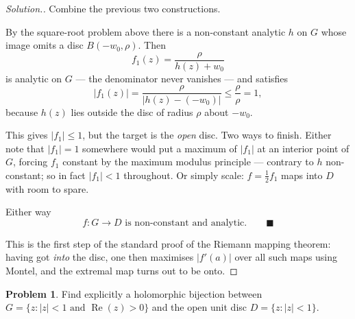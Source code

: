 \documentclass[11pt,a4paper]{article}
\theoremstyle{definition}
\newtheorem{problemx}{Problem}[section]
\newenvironment{problem}{\begin{problemx}}{\end{problemx}}
\newenvironment{solution}
  {\renewcommand{\qedsymbol}{}\begin{proof}[\textit{Solution}.]}
  {\end{proof}}
\begin{document}
\begin{solution}
Combine the previous two constructions.

By the square-root problem above there is a non-constant analytic $h$ on $G$ whose
image omits a disc $B(-w_0,\rho)$. Then
$$f_1(z) = \frac{\rho}{h(z)+w_0}$$
is analytic on $G$ --- the denominator never vanishes --- and satisfies
$$\left|f_1(z)\right| = \frac{\rho}{\left|h(z)-(-w_0)\right|} \leq \frac{\rho}{\rho} = 1,$$
because $h(z)$ lies outside the disc of radius $\rho$ about $-w_0$.

This gives $\left|f_1\right| \leq 1$, but the target is the \emph{open} disc. Two
ways to finish. Either note that $\left|f_1\right| = 1$ somewhere would put a
maximum of $\left|f_1\right|$ at an interior point of $G$, forcing $f_1$ constant
by the maximum modulus principle --- contrary to $h$ non-constant; so in fact
$\left|f_1\right| < 1$ throughout. Or simply scale: $f = \tfrac12 f_1$ maps into
$D$ with room to spare.

Either way
$$\boxed{f : G \longrightarrow D \text{ is non-constant and analytic.}}
\qquad \blacksquare$$

This is the first step of the standard proof of the Riemann mapping theorem: having
got \emph{into} the disc, one then maximises $\left|f'(a)\right|$ over all such
maps using Montel, and the extremal map turns out to be onto.
\end{solution}


\begin{problem}
Find explicitly a holomorphic bijection between
$G = \{z : \left|z\right| < 1 \text{ and } \operatorname{Re}(z) > 0\}$ and the
open unit disc $D = \{z : \left|z\right| < 1\}$.
\end{problem}
\end{document}
